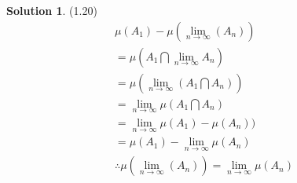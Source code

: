 \documentclass[letterpaper,12pt]{article}
\theoremstyle{definition}
\newtheorem{solution}[theorem]{Solution}
\begin{document}
\newpage
\begin{solution} (1.20) \\
\begin{gather*}
\mu(A_1) - \mu(\lim_{n \rightarrow \infty} (A_n))\\
= \mu(A_1 \bigcap \lim_{n \rightarrow \infty} A_n) \\
= \mu(\lim_{n \rightarrow \infty} (A_1 \bigcap A_n) ) \\
= \lim_{n \rightarrow \infty} \mu(A_1 \bigcap A_n) \\
= \lim_{n \rightarrow \infty} \mu(A_1) - \mu (A_n)) \\
= \mu(A_1) - \lim_{n \rightarrow \infty} \mu(A_n) \\
\therefore \mu(\lim_{n \rightarrow \infty} (A_n)) = \lim_{n \rightarrow \infty} \mu(A_n)
\end{gather*}
\end{solution}
\end{document}
